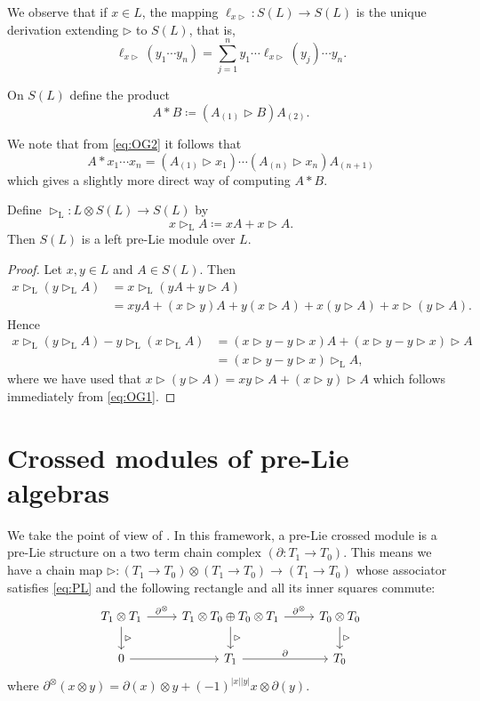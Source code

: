 \documentclass[noamsfonts, reqno]{amsart}
\newcommand{\prelie}{\mathbin{\vartriangleright}}
\newcommand{\laction}{\mathbin{\vartriangleright_{\mathrm{L}}}}
\begin{document}
We observe that if \(x\in L\), the mapping \(\ell_{x\prelie}\colon S(L)\to S(L)\) is the unique derivation extending \(\prelie\) to \(S(L)\), that is,
\[
  \ell_{x\prelie}(y_1\dotsm y_n) = \sum_{j=1}^{n}y_1\dotsm\ell_{x\prelie}(y_j)\dotsm y_n.
\]

\begin{definition}
  On \(S(L)\) define the product
  \[
    A\ast B \coloneqq (A_{(1)}\prelie B)A_{(2)}.
  \]
\end{definition}

We note that from \cref{eq:OG2} it follows that
\[
  A\ast x_1\dotsm x_n = (A_{(1)}\prelie x_1)\dotsm(A_{(n)}\prelie x_n)A_{(n+1)}
\]
which gives a slightly more direct way of computing \(A\ast B\).

\begin{proposition}
  \label{prop:laction}
  Define \(\laction\colon L \otimes S(L) \to S(L)\) by
  \[
    x\laction A \coloneqq xA + x\prelie A.
  \]
  Then \(S(L)\) is a left pre-Lie module over \(L\).
\end{proposition}
\begin{proof}
  Let \(x,y\in L\) and \(A\in S(L)\).
  Then
  \begin{align*}
    x\laction(y\laction A) &= x\laction(yA + y\prelie A) \\
    &= xyA + (x\prelie y)A + y(x\prelie A) + x(y\prelie A) + x\prelie(y\prelie A).
  \end{align*}
  Hence
  \begin{align*}
    x\laction(y\laction A) - y\laction(x\laction A) &= (x\prelie y - y\prelie x)A + (x\prelie y - y\prelie x)\prelie A \\
    &= (x\prelie y - y\prelie x)\laction A,
  \end{align*}
  where we have used that \(x\prelie (y\prelie A) = xy\prelie A + (x\prelie y)\prelie A\) which follows immediately from \cref{eq:OG1}.
\end{proof}

\section{Crossed modules of pre-Lie algebras}
We take the point of view of \cite{LRW2024}.
In this framework, a pre-Lie crossed module is a pre-Lie structure on a two term chain complex \((\partial\colon T_1\to T_0)\).
This means we have a chain map \(\prelie\colon(T_1\to T_0)\otimes(T_1\to T_0)\to(T_1\to T_0)\) whose associator satisfies \cref{eq:PL}
and the following rectangle and all its inner squares commute:
\[
  \begin{tikzcd}
  T_1\otimes T_1\ar[r,"\partial^\otimes"]\ar[d,"\prelie"]&T_1\otimes T_0\oplus T_0\otimes T_1\ar[d,"\prelie"]\ar[r,"\partial^\otimes"]&T_0\otimes T_0\ar[d,"\prelie"]\\
  0\ar[r]&T_1\ar[r,"\partial"]&T_0
  \end{tikzcd}
\]
where \(\partial^\otimes(x\otimes y) = \partial(x)\otimes y+(-1)^{|x||y|}x\otimes\partial(y)\).
\end{document}
